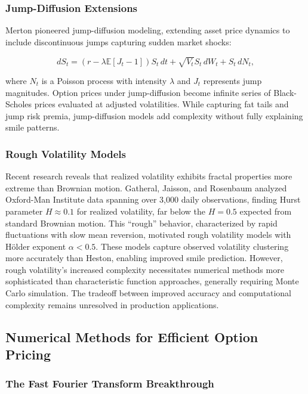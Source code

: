 \documentclass[12pt,a4paper]{article}
\begin{document}
\subsubsection{Jump-Diffusion Extensions}

Merton \cite{Merton1976} pioneered jump-diffusion modeling, extending asset price dynamics to include discontinuous jumps capturing sudden market shocks:

\begin{equation}
dS_t = (r - \lambda \mathbb{E}[J_t-1]) S_t \, dt + \sqrt{V_t} S_t \, dW_t + S_t \, dN_t,
\end{equation}

where $N_t$ is a Poisson process with intensity $\lambda$ and $J_t$ represents jump magnitudes. Option prices under jump-diffusion become infinite series of Black-Scholes prices evaluated at adjusted volatilities. While capturing fat tails and jump risk premia, jump-diffusion models add complexity without fully explaining smile patterns.

\subsubsection{Rough Volatility Models}

Recent research reveals that realized volatility exhibits fractal properties more extreme than Brownian motion. Gatheral, Jaisson, and Rosenbaum \cite{GatheralJaissonRosenbaum2018} analyzed Oxford-Man Institute data spanning over 3,000 daily observations, finding Hurst parameter $H \approx 0.1$ for realized volatility, far below the $H = 0.5$ expected from standard Brownian motion. This ``rough'' behavior, characterized by rapid fluctuations with slow mean reversion, motivated rough volatility models with Hölder exponent $\alpha < 0.5$. These models capture observed volatility clustering more accurately than Heston, enabling improved smile prediction. However, rough volatility's increased complexity necessitates numerical methods more sophisticated than characteristic function approaches, generally requiring Monte Carlo simulation. The tradeoff between improved accuracy and computational complexity remains unresolved in production applications.

\subsection{Numerical Methods for Efficient Option Pricing}

\subsubsection{The Fast Fourier Transform Breakthrough}
\end{document}
